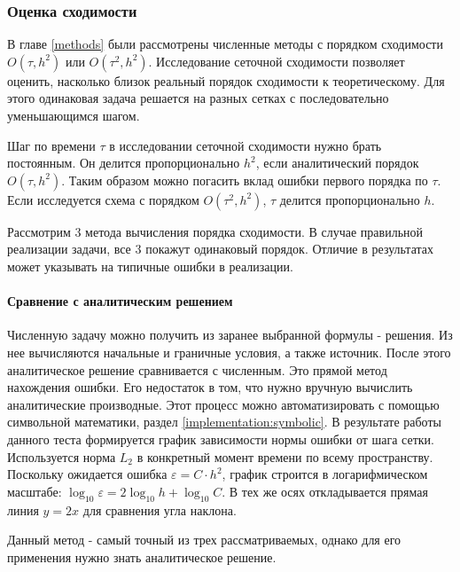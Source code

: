 \subsubsection*{Оценка сходимости \label{implementation:convergence} }
В главе \ref{methods} были рассмотрены численные методы с порядком сходимости $O(\tau, h^2)$ или $O(\tau^2, h^2)$. Исследование сеточной сходимости позволяет оценить, насколько близок реальный порядок сходимости к теоретическому. Для этого одинаковая задача решается на разных сетках с последовательно уменьшающимся шагом. 
\par
Шаг по времени $\tau$ в исследовании сеточной сходимости нужно брать постоянным. Он делится пропорционально $h^2$, если аналитический порядок $O(\tau, h^2)$. Таким образом можно погасить вклад ошибки первого порядка по $\tau$. Если исследуется схема с порядком $O(\tau^2, h^2)$, $\tau$ делится пропорционально $h$.
\par
Рассмотрим 3 метода вычисления порядка сходимости. В случае правильной реализации задачи, все 3 покажут одинаковый порядок. Отличие в результатах может указывать на типичные ошибки в реализации.
\paragraph{Сравнение с аналитическим решением}
Численную задачу можно получить из заранее выбранной формулы - решения. Из нее вычисляются начальные и граничные условия, а также источник. После этого аналитическое решение сравнивается с численным. Это прямой метод нахождения ошибки. Его недостаток в том, что нужно вручную вычислить аналитические производные. Этот процесс можно автоматизировать с помощью символьной математики, раздел \ref{implementation:symbolic}. В результате работы данного теста формируется график зависимости нормы ошибки от шага сетки. Используется норма $L_2$ в конкретный момент времени по всему пространству. Поскольку ожидается ошибка $\varepsilon = C \cdot h^2$, график строится в логарифмическом масштабе: $\log_{10} \varepsilon = 2 \log_{10} h + \log_{10} C$. В тех же осях откладывается прямая линия $y = 2x$ для сравнения угла наклона. 
\par
Данный метод - самый точный из трех рассматриваемых, однако для его применения нужно знать аналитическое решение.

